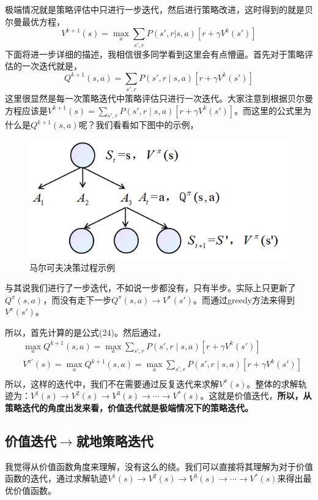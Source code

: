 \documentclass[a4paper]{article}
\begin{document}
极端情况就是策略评估中只进行一步迭代，然后进行策略改进，这时得到的就是贝尔曼最优方程，
\begin{equation}
    V^{k+1}(s) = \max_a \sum_{s',r} P(s',r|s,a)[r + \gamma V^{k}(s')]
\end{equation}
下面将进一步详细的描述，我相信很多同学看到这里会有点懵逼。首先对于策略评估的一次迭代就是，
\begin{equation}
    Q^{k+1}(s,a) = \sum_{s',r} P(s',r\mid s,a)[r+\gamma V^{k}(s')]
\end{equation}
这里很显然是每一次策略迭代中策略评估只进行一次迭代。大家注意到根据贝尔曼方程应该是$V^{k+1}(s) = \sum_{s',r} P(s',r\mid s,a)[r+\gamma V^{k}(s')]$。而这里的公式里为什么是$Q^{k+1}(s,a)$呢？我们看看如下图中的示例，
\begin{figure}[H]
    \centering
    \includegraphics[width=.55\textwidth]{微信图片_20200726193005.png}
    \caption{马尔可夫决策过程示例}
    \label{fig:my_label_1}
\end{figure}
与其说我们进行了一步迭代，不如说一步都没有，只有半步。实际上只更新了$Q^\pi(s,a)$，而没有走下一步$Q^\pi(s,a)\to V^\pi(s')$。而通过greedy方法来得到$V^\pi(s')$。

所以，首先计算的是公式(24)。然后通过，
\begin{equation}
    \begin{aligned}
        & \max_a Q^{k+1}(s,a) = \max_a \sum_{s',r} P(s',r\mid s,a)[r+\gamma V^{k}(s')] \\
        & V^{\pi'}(s) = \max_a Q^{k+1}(s,a) = \max_a \sum_{s',r} P(s',r\mid s,a)[r+\gamma V^{k}(s')] \\
    \end{aligned}
\end{equation}
所以，这样的迭代中，我们不在需要通过反复迭代来求解$V^\pi(s)$。整体的求解轨迹为：$V^1(s)\to V^2(s)\to V^3(s)\to \cdots\to V^\ast(s)$。这就是价值迭代，\textbf{所以，从策略迭代的角度出发来看，价值迭代就是极端情况下的策略迭代。}

\subsection{价值迭代$\to$就地策略迭代}
我觉得从价值函数角度来理解，没有这么的绕。我们可以直接将其理解为对于价值函数的迭代，通过求解轨迹$V^1(s)\to V^2(s)\to V^3(s)\to \cdots\to V^\ast(s)$来得出最优价值函数。
\end{document}
